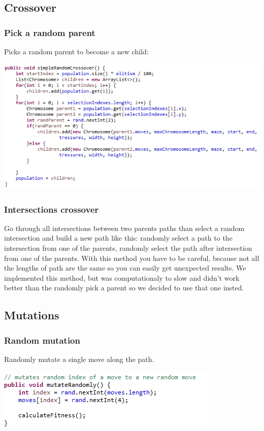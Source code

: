 \documentclass[12pt]{article} %
\begin{document}
\subsection{Crossover}
\subsubsection{Pick a random parent}
Picks a random parent to become a new child:

\includegraphics[scale=1]{pickARandomParentCrossover}


\subsubsection{Intersections crossover}
Go through all intersections between two parents paths than select a random intersection and build a new path like this: randomly select a path to the
intersection from one of the parents, randomly select the path after intersection from one of the parents. With this method you have to be careful, 
because not all the lengths of path are the same so you can easily get unexpected results. We implemented this method, but was computationaly to slow 
and didn't work better than the randomly pick a parent so we decided to use that one insted.

\subsection{Mutations}
\subsubsection{Random mutation}
Randomly mutate a single move along the path.

\includegraphics[scale=1]{randomMutation}
\end{document}
